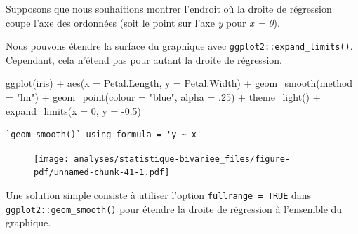 \documentclass[
  letterpaper,
  DIV=11,
  numbers=noendperiod,
  oneside]{scrreprt}
\newenvironment{Shaded}{\begin{snugshade}}{\end{snugshade}}
\newcommand{\AttributeTok}[1]{\textcolor[rgb]{0.40,0.45,0.13}{#1}}
\newcommand{\DecValTok}[1]{\textcolor[rgb]{0.68,0.00,0.00}{#1}}
\newcommand{\FloatTok}[1]{\textcolor[rgb]{0.68,0.00,0.00}{#1}}
\newcommand{\FunctionTok}[1]{\textcolor[rgb]{0.28,0.35,0.67}{#1}}
\newcommand{\NormalTok}[1]{\textcolor[rgb]{0.00,0.23,0.31}{#1}}
\newcommand{\SpecialCharTok}[1]{\textcolor[rgb]{0.37,0.37,0.37}{#1}}
\newcommand{\StringTok}[1]{\textcolor[rgb]{0.13,0.47,0.30}{#1}}
\begin{document}
\begin{tcolorbox}[enhanced jigsaw, colbacktitle=quarto-callout-tip-color!10!white, opacityback=0, toprule=.15mm, colback=white, coltitle=black, bottomtitle=1mm, toptitle=1mm, titlerule=0mm, rightrule=.15mm, title=\textcolor{quarto-callout-tip-color}{\faLightbulb}\hspace{0.5em}{Astuce pour afficher l'intercept}, breakable, bottomrule=.15mm, opacitybacktitle=0.6, arc=.35mm, left=2mm, leftrule=.75mm, colframe=quarto-callout-tip-color-frame]

Supposons que nous souhaitions montrer l'endroit où la droite de
régression coupe l'axe des ordonnées (soit le point sur l'axe \emph{y}
pour \emph{x = 0}).

Nous pouvons étendre la surface du graphique avec
\texttt{ggplot2::expand\_limits()}. Cependant, cela n'étend pas pour
autant la droite de régression.

\begin{Shaded}
\begin{Highlighting}[]
\FunctionTok{ggplot}\NormalTok{(iris) }\SpecialCharTok{+}
  \FunctionTok{aes}\NormalTok{(}\AttributeTok{x =}\NormalTok{ Petal.Length, }\AttributeTok{y =}\NormalTok{ Petal.Width) }\SpecialCharTok{+}
  \FunctionTok{geom\_smooth}\NormalTok{(}\AttributeTok{method =} \StringTok{"lm"}\NormalTok{) }\SpecialCharTok{+}
  \FunctionTok{geom\_point}\NormalTok{(}\AttributeTok{colour =} \StringTok{"blue"}\NormalTok{, }\AttributeTok{alpha =}\NormalTok{ .}\DecValTok{25}\NormalTok{) }\SpecialCharTok{+}
  \FunctionTok{theme\_light}\NormalTok{() }\SpecialCharTok{+}
  \FunctionTok{expand\_limits}\NormalTok{(}\AttributeTok{x =} \DecValTok{0}\NormalTok{, }\AttributeTok{y =} \SpecialCharTok{{-}}\FloatTok{0.5}\NormalTok{)}
\end{Highlighting}
\end{Shaded}

\begin{verbatim}
`geom_smooth()` using formula = 'y ~ x'
\end{verbatim}

\begin{figure}[H]

{\centering \texttt{[image: analyses/statistique-bivariee\_files/figure-pdf/unnamed-chunk-41-1.pdf]}

}

\end{figure}

Une solution simple consiste à utiliser l'option
\texttt{fullrange\ =\ TRUE} dans \texttt{ggplot2::geom\_smooth()} pour
étendre la droite de régression à l'ensemble du graphique.


\end{tcolorbox}
\end{document}

